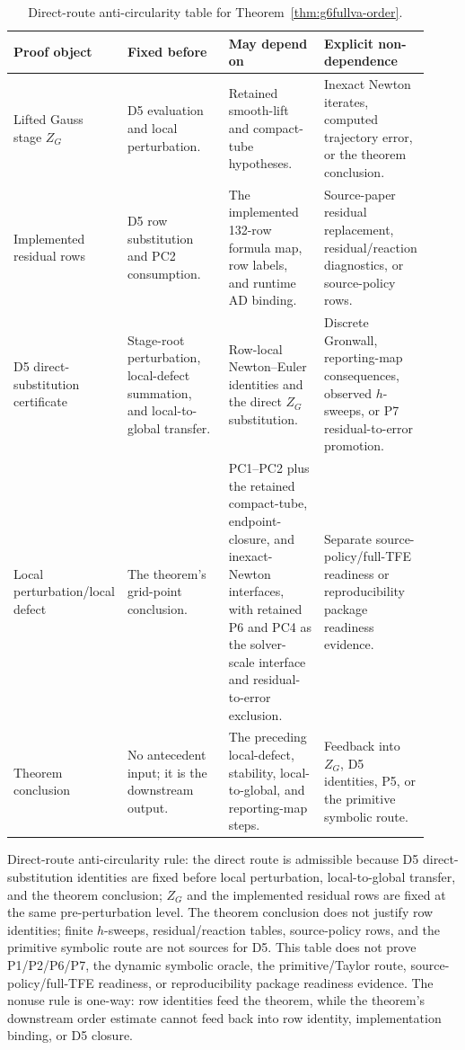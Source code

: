 \documentclass[preprint,12pt]{elsarticle}
\newcommand{\tfe}{TFE}
\begin{document}
\begin{table}[htbp]
\centering
\caption{Direct-route anti-circularity table for
Theorem~\ref{thm:g6fullva-order}.}
\label{tab:direct-route-anticircularity-ledger}
\scriptsize
\setlength{\tabcolsep}{2pt}
\renewcommand{\arraystretch}{0.9}
\begin{tabular}{P{0.18\linewidth}P{0.28\linewidth}P{0.26\linewidth}P{0.20\linewidth}}
\toprule
Proof object & Fixed before & May depend on & Explicit non-dependence \\
\midrule
Lifted Gauss stage \(Z_G\) &
D5 evaluation and local perturbation. &
Retained smooth-lift and compact-tube hypotheses. &
Inexact Newton iterates, computed trajectory error, or the theorem conclusion. \\
Implemented residual rows &
D5 row substitution and PC2 consumption. &
The implemented 132-row formula map, row labels, and runtime AD binding. &
Source-paper residual replacement, residual/reaction diagnostics, or
source-policy rows. \\
D5 direct-substitution certificate &
Stage-root perturbation, local-defect summation, and local-to-global transfer. &
Row-local Newton--Euler identities and the direct \(Z_G\) substitution. &
Discrete Gronwall, reporting-map consequences, observed \(h\)-sweeps, or P7
residual-to-error promotion. \\
Local perturbation/local defect &
The theorem's grid-point conclusion. &
PC1--PC2 plus the retained compact-tube, endpoint-closure, and inexact-Newton
interfaces, with retained P6 and PC4 as the solver-scale interface and
residual-to-error exclusion. &
Separate source-policy/full-\tfe{} readiness or reproducibility package readiness evidence. \\
Theorem conclusion &
No antecedent input; it is the downstream output. &
The preceding local-defect, stability, local-to-global, and reporting-map
steps. &
Feedback into \(Z_G\), D5 identities, P5, or the primitive symbolic route. \\
\bottomrule
\end{tabular}
\end{table}

Direct-route anti-circularity rule: the direct route
is admissible because D5 direct-substitution identities are fixed before local
perturbation, local-to-global transfer, and the theorem conclusion; \(Z_G\)
and the implemented residual rows are fixed at the same pre-perturbation level.
The theorem conclusion
does not justify row identities; finite \(h\)-sweeps, residual/reaction
tables, source-policy rows, and the primitive symbolic route are not sources
for D5. This table does not prove P1/P2/P6/P7, the dynamic symbolic oracle,
the primitive/Taylor route, source-policy/full-\tfe{} readiness, or
reproducibility package readiness evidence.
The nonuse rule is one-way: row identities feed the theorem, while the
theorem's downstream order estimate cannot feed back into row identity,
implementation binding, or D5 closure.
\end{document}
